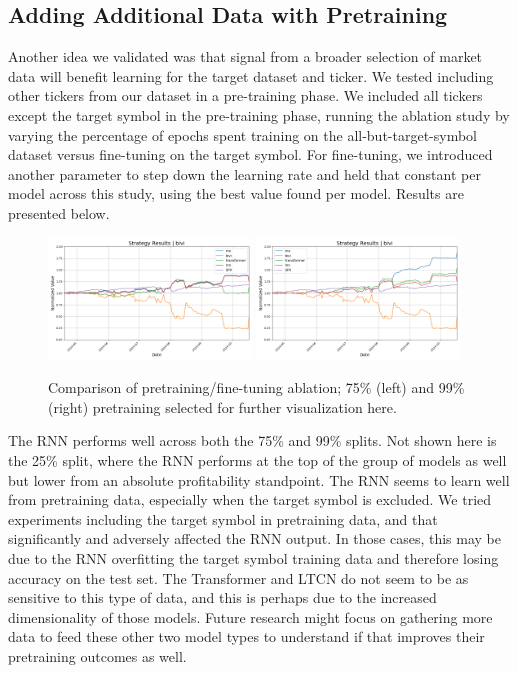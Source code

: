 \documentclass[10pt,twocolumn,letterpaper]{article}
\begin{document}
\subsection{Adding Additional Data with Pretraining}

Another idea we validated was that signal from a broader selection of market data will benefit learning for the target dataset and ticker. We tested including other tickers from our dataset in a pre-training phase. We included all tickers except the target symbol in the pre-training phase, running the ablation study by varying the percentage of epochs spent training on the all-but-target-symbol dataset versus fine-tuning on the target symbol. For fine-tuning, we introduced another parameter to step down the learning rate and held that constant per model across this study, using the best value found per model.  Results are presented below.

\begin{figure}[ht!]
    \centering
    \includegraphics[width=0.48\textwidth]{../figures/simulation_results_all_models_bivi_config_target_split_75_regenerated_anarasimham.yml.png}
    \includegraphics[width=0.48\textwidth]{../figures/simulation_results_all_models_bivi_config_target_split_99.yml.png} 
    \caption{Comparison of pretraining/fine-tuning ablation; 75\% (left) and 99\% (right) pretraining selected for further visualization here.}
    \label{fig:pretrainingsplits}
\end{figure}

The RNN performs well across both the 75\% and 99\% splits. Not shown here is the 25\% split, where the RNN performs at the top of the group of models as well but lower from an absolute profitability standpoint. The RNN seems to learn well from pretraining data, especially when the target symbol is excluded. We tried experiments including the target symbol in pretraining data, and that significantly and adversely affected the RNN output. In those cases, this may be due to the RNN overfitting the target symbol training data and therefore losing accuracy on the test set. The Transformer and LTCN do not seem to be as sensitive to this type of data, and this is perhaps due to the increased dimensionality of those models. Future research might focus on gathering more data to feed these other two model types to understand if that improves their pretraining outcomes as well.
\end{document}
